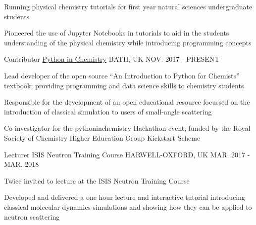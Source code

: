 \begin{cventries}
{\begin{cvitems}
			\item {Running physical chemistry tutorials for first year natural sciences undergraduate students}
			\item {Pioneered the use of Jupyter Notebooks in tutorials to aid in the students understanding of the physical chemistry while introducing programming concepts}
		\end{cvitems}
	}
	\cventry
	{Contributor}
	{\href{https://pythoninchemistry.org}{Python in Chemistry}}
	{BATH, UK}
	{NOV. 2017 - PRESENT}
	{
		\begin{cvitems}
			\item {Lead developer of the open source ``An Introduction to Python for Chemists'' textbook; providing programming and data science skills to chemistry students}
			\item {Responsible for the development of an open educational resource focussed on the introduction of classical simulation to users of small-angle scattering}
			\item {Co-investigator for the pythoninchemistry Hackathon event, funded by the Royal Society of Chemistry Higher Education Group Kickstart Scheme}
		\end{cvitems}
	}
	\cventry
	{Lecturer}
	{ISIS Neutron Training Course}
	{HARWELL-OXFORD, UK}
	{MAR. 2017 - MAR. 2018}
	{
		\begin{cvitems}
			\item {Twice invited to lecture at the ISIS Neutron Training Course}
			\item {Developed and delivered a one hour lecture and interactive tutorial introducing classical molecular dynamics simulations and showing how they can be applied to neutron scattering}
		\end{cvitems}
	}
\end{cventries}
